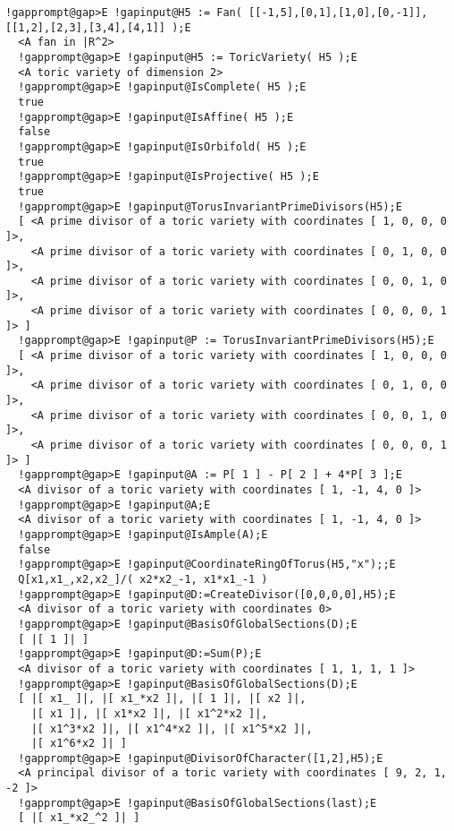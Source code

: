 \documentclass[a4paper,11pt]{report}
\begin{document}
{{{\begin{Verbatim}[commandchars=!@E,fontsize=\small,frame=single,label=Example]
  !gapprompt@gap>E !gapinput@H5 := Fan( [[-1,5],[0,1],[1,0],[0,-1]],[[1,2],[2,3],[3,4],[4,1]] );E
  <A fan in |R^2>
  !gapprompt@gap>E !gapinput@H5 := ToricVariety( H5 );E
  <A toric variety of dimension 2>
  !gapprompt@gap>E !gapinput@IsComplete( H5 );E
  true
  !gapprompt@gap>E !gapinput@IsAffine( H5 );E
  false
  !gapprompt@gap>E !gapinput@IsOrbifold( H5 );E
  true
  !gapprompt@gap>E !gapinput@IsProjective( H5 );E
  true
  !gapprompt@gap>E !gapinput@TorusInvariantPrimeDivisors(H5);E
  [ <A prime divisor of a toric variety with coordinates [ 1, 0, 0, 0 ]>,
    <A prime divisor of a toric variety with coordinates [ 0, 1, 0, 0 ]>, 
    <A prime divisor of a toric variety with coordinates [ 0, 0, 1, 0 ]>,
    <A prime divisor of a toric variety with coordinates [ 0, 0, 0, 1 ]> ]
  !gapprompt@gap>E !gapinput@P := TorusInvariantPrimeDivisors(H5);E
  [ <A prime divisor of a toric variety with coordinates [ 1, 0, 0, 0 ]>,
    <A prime divisor of a toric variety with coordinates [ 0, 1, 0, 0 ]>, 
    <A prime divisor of a toric variety with coordinates [ 0, 0, 1, 0 ]>, 
    <A prime divisor of a toric variety with coordinates [ 0, 0, 0, 1 ]> ]
  !gapprompt@gap>E !gapinput@A := P[ 1 ] - P[ 2 ] + 4*P[ 3 ];E
  <A divisor of a toric variety with coordinates [ 1, -1, 4, 0 ]>
  !gapprompt@gap>E !gapinput@A;E
  <A divisor of a toric variety with coordinates [ 1, -1, 4, 0 ]>
  !gapprompt@gap>E !gapinput@IsAmple(A);E
  false
  !gapprompt@gap>E !gapinput@CoordinateRingOfTorus(H5,"x");;E
  Q[x1,x1_,x2,x2_]/( x2*x2_-1, x1*x1_-1 )
  !gapprompt@gap>E !gapinput@D:=CreateDivisor([0,0,0,0],H5);E
  <A divisor of a toric variety with coordinates 0>
  !gapprompt@gap>E !gapinput@BasisOfGlobalSections(D);E
  [ |[ 1 ]| ]
  !gapprompt@gap>E !gapinput@D:=Sum(P);E
  <A divisor of a toric variety with coordinates [ 1, 1, 1, 1 ]>
  !gapprompt@gap>E !gapinput@BasisOfGlobalSections(D);E
  [ |[ x1_ ]|, |[ x1_*x2 ]|, |[ 1 ]|, |[ x2 ]|,
    |[ x1 ]|, |[ x1*x2 ]|, |[ x1^2*x2 ]|, 
    |[ x1^3*x2 ]|, |[ x1^4*x2 ]|, |[ x1^5*x2 ]|, 
    |[ x1^6*x2 ]| ]
  !gapprompt@gap>E !gapinput@DivisorOfCharacter([1,2],H5);E
  <A principal divisor of a toric variety with coordinates [ 9, 2, 1, -2 ]>
  !gapprompt@gap>E !gapinput@BasisOfGlobalSections(last);E
  [ |[ x1_*x2_^2 ]| ]
\end{Verbatim}
}

 }

  }

   
\end{document}
